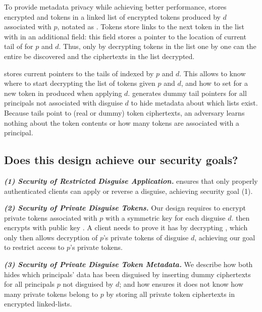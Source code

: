 To provide metadata privacy while achieving better performance, \sys stores encrypted  and
 tokens in a linked list of encrypted tokens produced by $d$ associated with $p$, notated
as . 
Tokens store links to the next token in the list with in an additional  field: this
field stores a pointer to the location of current tail of  for $p$ and $d$.
Thus, only by decrypting tokens in the list one by one can the entire  be discovered and
the ciphertexts in the list decrypted.

\sys stores current pointers to the tails of  indexed by $p$ and $d$. This allows \sys to
know where to start decrypting the list of tokens given $p$ and $d$, and how to set
 for a new token in  produced when applying $d$. \sys generates dummy
tail pointers for all principals not associated with disguise $d$ to hide metadata about which lists
exist.
Because  tails point to (real or dummy) token ciphertexts, an adversary learns nothing
about the token contents or how many tokens are associated with a principal.

\subsection{Does this design achieve our security goals?}
\label{sec:achievegoals}
\vspace{6pt}\noindent\textbf{\emph{(1) Security of Restricted Disguise Application.}}
\sys ensures that only properly authenticated clients can apply or
reverse a disguise, achieving security goal (1).

\vspace{6pt}\noindent\textbf{\emph{(2) Security of Private Disguise Tokens.}}
Our design requires \sys to encrypt private tokens associated with $p$ with a symmetric key
 for each disguise $d$. \sys then encrypts  with public key .  
A client needs to prove it has  by decrypting , which only then allows decryption
of $p$'s private tokens of disguise $d$, achieving our goal to restrict access to $p$'s private
tokens.


\vspace{6pt}\noindent\textbf{\emph{(3) Security of Private Disguise Token Metadata.}}
We describe how \sys both hides which principals' data has
been disguised by inserting dummy  ciphertexts for all principals $p$ not disguised by $d$;
and how \sys ensures it does not know how many private tokens belong to $p$ by storing all private token
ciphertexts in encrypted linked-lists.
